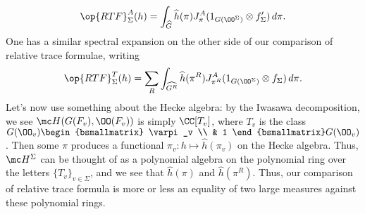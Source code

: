 \documentclass[../notes.tex]{subfiles}
\begin{document}
\[\op{RTF}^A_\Sigma(h)=\int_{\widehat G} \widehat h(\pi)J_\pi^A(1_{G(\OO^\Sigma)}\otimes f_\Sigma')\,d\pi.\]
One has a similar spectral expansion on the other side of our comparison of relative trace formulae, writing
\[\op{RTF}^T_{\Sigma}(h)=\sum_R\int_{\widehat{G^R}}\widehat h(\pi^R)J^A_{\pi^R}(1_{G(\OO^\Sigma)}\otimes f_\Sigma)\,d\pi.\]
Let's now use something about the Hecke algebra: by the Iwasawa decomposition, we see $\mc H(G(F_v),\OO(F_v))$ is simply $\CC[T_v]$, where $T_v$ is the class $G(\OO_v)\begin{bsmallmatrix}
	\varpi_v \\ & 1
\end{bsmallmatrix}G(\OO_v)$. Then some $\pi$ produces a functional $\pi_v\colon h\mapsto\widehat h(\pi_v)$ on the Hecke algebra. Thus, $\mc H^\Sigma$ can be thought of as a polynomial algebra on the polynomial ring over the letters $\{T_v\}_{v\in\Sigma}$, and we see that $\widehat h(\pi)$ and $\widehat h(\pi^R)$. Thus, our comparison of relative trace formula is more or less an equality of two large measures against these polynomial rings.
\end{document}
